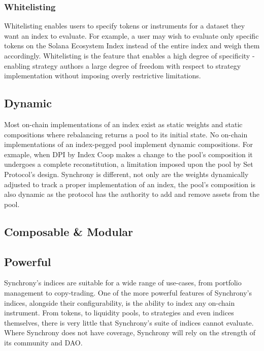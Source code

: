 \documentclass[10pt]{article}
\begin{document}
					\subsubsection{Whitelisting}
					Whitelisting enables users to specify tokens or instruments for a dataset they
					want an index to evaluate. For example, a user may wish to evaluate only
					specific tokens on the Solana Ecosystem Index instead of the entire index and
					weigh them accordingly. Whitelisting is the feature that enables a high degree
					of specificity - enabling strategy authors a large degree of freedom with
					respect to strategy implementation without imposing overly restrictive
					limitations.

					\subsection{Dynamic}
					Most on-chain implementations of an index exist as static weights and static
					compositions where rebalancing returns a pool to its initial state. No on-chain
					implementations of an index-pegged pool implement dynamic compositions. For
					exmaple, when DPI by Index Coop makes a change to the pool's composition it
					undergoes a complete reconstitution, a limitation imposed upon the pool by Set
					Protocol's design. Synchrony is different, not only are the weights dynamically
					adjusted to track a proper implementation of an index, the pool's composition is
					also dynamic as the protocol has the authority to add and remove assets from the
					pool.

					\subsection{Composable \& Modular}
				
					\subsection{Powerful}
					Synchrony's indices are suitable for a wide range of use-cases, from portfolio
					management to copy-trading. One of the more powerful features of Synchrony's
					indices, alongside their configurability, is the ability to index any on-chain
					instrument. From tokens, to liquidity pools, to strategies and even indices
					themselves, there is very little that Synchrony's suite of indices cannot
					evaluate. Where Synchrony does not have coverage, Synchrony will rely on the
					strength of its community and DAO.
\end{document}
